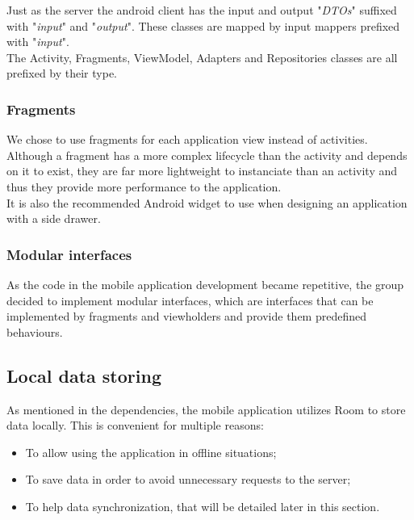 Just as the server the android client has the input and output "\textit{DTOs}" suffixed with "\textit{input}" and "\textit{output}". 
These classes are mapped by input mappers prefixed with "\textit{input}".\\

The Activity, Fragments, ViewModel, Adapters and Repositories classes are all prefixed by their type.

\subsubsection{Fragments}

We chose to use fragments\cite{fragment} for each application view instead of activities. Although a fragment has a more complex lifecycle than the activity and depends on it
to exist, they are far more lightweight to instanciate than an activity and thus they provide more performance to the application.\\ 

It is also the recommended Android widget to use when designing an application with a side drawer.\\

\subsubsection{Modular interfaces}

As the code in the mobile application development became repetitive, the group decided to implement modular interfaces,
which are interfaces that can be implemented by fragments and viewholders and provide them predefined behaviours.

\subsection{Local data storing}

As mentioned in the dependencies, the mobile application utilizes Room to store data locally. This is convenient
for multiple reasons: 
\begin{itemize}
    \item To allow using the application in offline situations;
    \item To save data in order to avoid unnecessary requests to the server;
    \item To help data synchronization, that will be detailed later in this section.
\end{itemize}

